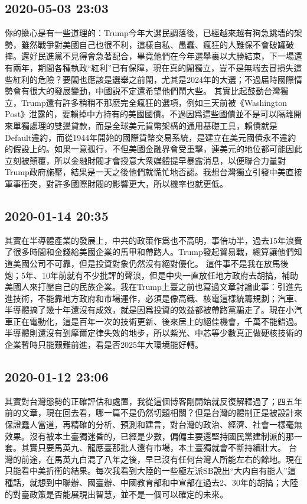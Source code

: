\documentclass[twocolumn]{ctexart}
\begin{document}
\subsection*{2020-05-03 23:03}

你的擔心是有一些道理的：Trump今年大選民調落後，已經越來越有狗急跳墻的架勢，雖然戰爭對美國自己也很不利，這樣自私、愚蠢、瘋狂的人難保不會破罐破摔。還好民進黨不見得會急著配合，畢竟他們在今年選舉裏以大勝結束，下一場還有兩年，期間各種執政“紅利”已有保障，現在真的閙獨立，豈不是無端去冒損失這些紅利的危險？要閙也應該是選舉之前閙，尤其是2024年的大選；不過届時國際情勢會有很大的發展變動，中國説不定還希望他們鬧大些。
其實比起鼓動台灣獨立，Trump還有許多稍稍不那麽完全瘋狂的選項，例如三天前被《Washington Post》泄露的，要賴掉中方持有的美國國債。不過因爲這些國債並不是可以隔離開來單獨處理的雙邊貸款，而是全球美元貨幣架構的通用基礎工具，賴債就是Default違約，而從1944年開始的國際貨幣交易系統，是建立在美元國債永不違約的假設上的。如果一意孤行，不但美國金融界會受重擊，連美元的地位都可能因此立刻被顛覆，所以金融財閥才會授意大衆媒體提早暴露消息，以便聯合力量對Trump政府施壓，結果是一天之後他們就慌忙地否認。我想台灣獨立引發中美直接軍事衝突，對許多國際財閥的影響更大，所以機率也就更低。
\subsection*{2020-01-14 20:35}

其實在半導體產業的發展上，中共的政策作爲也不高明，事倍功半，過去15年浪費了很多時間和金錢給美國企業的馬甲和帶路人。Trump發起貿易戰，總算讓他們知道美國公司不可靠，但是投資對象仍然沒有絕對優化。
這件事不是我在放馬後炮；5年、10年前就有不少批評的聲浪，但是中央一直放任地方政府去胡搞，補助美國人來打壓自己的民族企業。我在Trump上臺之前也寫過文章討論此事：引進先進技術，不能靠地方政府和市場運作，必須是像高鐵、核電這樣統籌規劃；汽車、半導體搞了幾十年還沒有成效，就是因爲投資的效益都被帶路黨騙走了。現在小汽車正在電動化，這是百年一次的技術更新、後來居上的絕佳機會，千萬不能錯過。半導體則還沒有到摩爾定律失效的地步，所以紫光、中芯等少數真正做硬核技術的企業暫時只能艱難前進，看是否2025年大環境能好轉。
\subsection*{2020-01-12 23:06}

其實對台灣態勢的正確評估和處置，我從這個博客剛開始就反復解釋過了；四五年前的文章，現在回去看，哪一篇不是仍然切題相關？但是台灣的體制正是被設計來保證蠢人當道，再精確的分析、預測和建言，對台灣的政治、經濟、社會一樣毫無效果。沒有被本土臺獨迷昏的，已經是少數，偏偏主要還堅持國民黨建制派的那一套。其實只要馬英九、龍應臺那批人還有市場，本土臺獨就會不斷持續壯大。
台灣的前途，在馬英九白混了八年之後，早已沒有任何台灣人所能左右的餘地。現在只能看中美折衝的結果。每次我看到大陸的一些極左派SB說出“大内自有能人”這種話，就想到中聯辦、國臺辦、中國教育部和中宣部在過去2、30年的胡搞；大陸的對臺政策是否能展現出智慧，並不是一個可以確定的未來。
\end{document}
